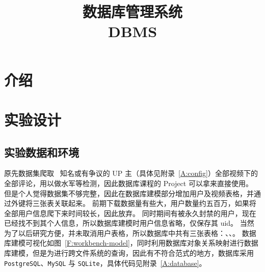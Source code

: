 %
%
%
\title{数据库管理系统 \\ DBMS}

\maketitle\tableofcontents\clearpage

\section{介绍}
\lipsum[1]



\section{实验设计}
\subsection{实验数据和环境}
原先数据集爬取 \bilibili\ 知名或有争议的 UP 主（具体见附录~\ref{A:config}）全部视频下的全部评论，用以做水军等检测，因此数据库课程的 Project 可以拿来直接使用。
但是个人觉得数据集不够完整，因此在数据库建模部分增加用户及视频表格，并通过外键将三张表关联起来。
前期下载数据量有些大，用户数量约五百万，如果将全部用户信息爬下来时间较长，因此放弃。
同时期间有被永久封禁的用户，现在已经找不到其个人信息，所以数据库建模时用户信息省略，仅保存其 uid。
当然为了以后研究方便，并未取消用户表格，所以数据库中共有三张表格：、、。
数据库建模可视化如图~\ref{F:workbench-model}，同时利用数据库对象关系映射\cite{sqlalchemy2020sqlalchemy}进行数据库建模，但是为进行跨文件系统的查询，因此有不符合范式的地方，数据库采用 \texttt{PostgreSQL}、\texttt{MySQL} 与 \texttt{SQLite}，具体代码见附录~\ref{A:database}。

